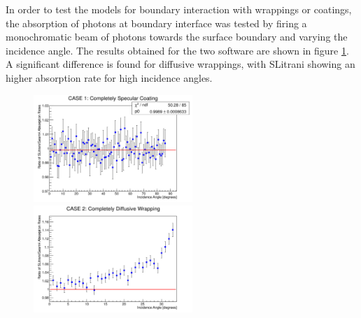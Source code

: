 In order to test the models for boundary interaction with wrappings or coatings, the absorption of photons at boundary interface was tested by firing a monochromatic beam of photons towards the surface boundary and varying the incidence angle. The results obtained for the two software are shown in figure \ref{fig:surface}.
A significant difference is found for diffusive wrappings, with SLitrani showing an higher absorption rate for high incidence angles.
\begin{figure}[htbp]
\begin{center}
\includegraphics[width=6cm]{../Pictures/Chapter_5/specular.png}
\includegraphics[width=6cm]{../Pictures/Chapter_5/diffusive.png}
\end{center}
\caption[]{}
\label{fig:surface}
\end{figure}

